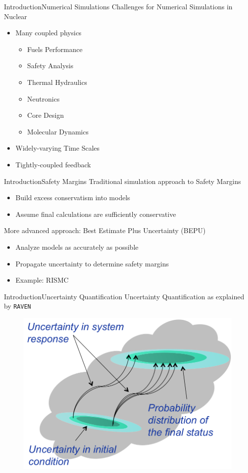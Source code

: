 \documentclass{beamer}
\newcommand{\raven}{\texttt{RAVEN}}
\begin{document}
\begin{frame}{Introduction}{Numerical Simulations}\vspace{-20pt}
  \vfill
  Challenges for Numerical Simulations in Nuclear
  \vfill
  \begin{itemize}
    \item Many coupled physics
      \begin{itemize}
        \item Fuels Performance
        \item Safety Analysis
        \item Thermal Hydraulics
        \item Neutronics
        \item Core Design
        \item Molecular Dynamics
      \end{itemize}
  \vfill
    \item Widely-varying Time Scales
  \vfill
    \item Tightly-coupled feedback
  \end{itemize}
  \vfill
\end{frame}


\begin{frame}{Introduction}{Safety Margins}\vspace{-10pt}
  Traditional simulation approach to Safety Margins
  \vfill
  \begin{itemize}
    \item Build excess conservatism into models
    \item Assume final calculations are sufficiently conservative
  \end{itemize}
  \vfill
  More advanced approach: Best Estimate Plus Uncertainty (BEPU)
  \vfill
  \begin{itemize}
    \item Analyze models as accurately as possible
    \item Propagate uncertainty to determine safety margins
    \item Example: RISMC
  \end{itemize}
  \vfill
\end{frame}


\begin{frame}{Introduction}{Uncertainty Quantification}
  Uncertainty Quantification as explained by \raven{}
  \begin{figure}[h!]
    \centering
    \includegraphics[width=0.7\linewidth]{present/uq}
  \end{figure}
\end{frame}
\end{document}
